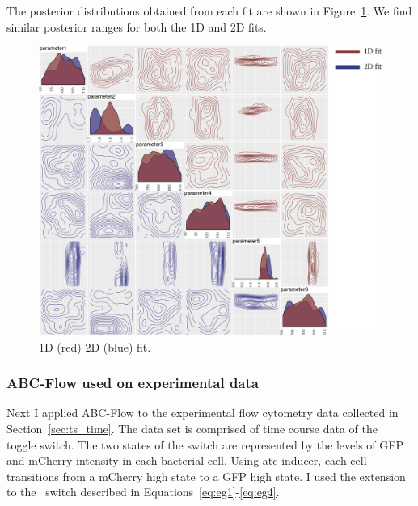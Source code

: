 The posterior distributions obtained from each fit are shown in Figure~\ref{fig:1d2d-sim-post}. We find similar posterior ranges for both the 1D and 2D fits.

\begin{figure}[htbp]
\centering
	\includegraphics[scale=0.8]{../../chapters/chapterABCFlow/images/sim_1d_2d_post.png}
	\caption[LoF caption]{\label{fig:1d2d-sim-post} 1D (red) 2D (blue) fit. }
\end{figure}





\clearpage
\subsubsection{ABC-Flow used on experimental data}
 
Next I applied ABC-Flow to the experimental flow cytometry data collected in Section~\ref{sec:ts_time}. The data set is comprised of time course data of the~\textcite{Litcofsky:2012gr} toggle switch. The two states of the switch are represented by the levels of GFP and mCherry intensity in each bacterial cell. Using \acrshort{atc} inducer, each cell transitions from a mCherry high state to a GFP high state. I used the extension to the~\textcite{Gardner:2000vha} switch described in Equations~\ref{eq:eg1}-\ref{eq:eg4}.

